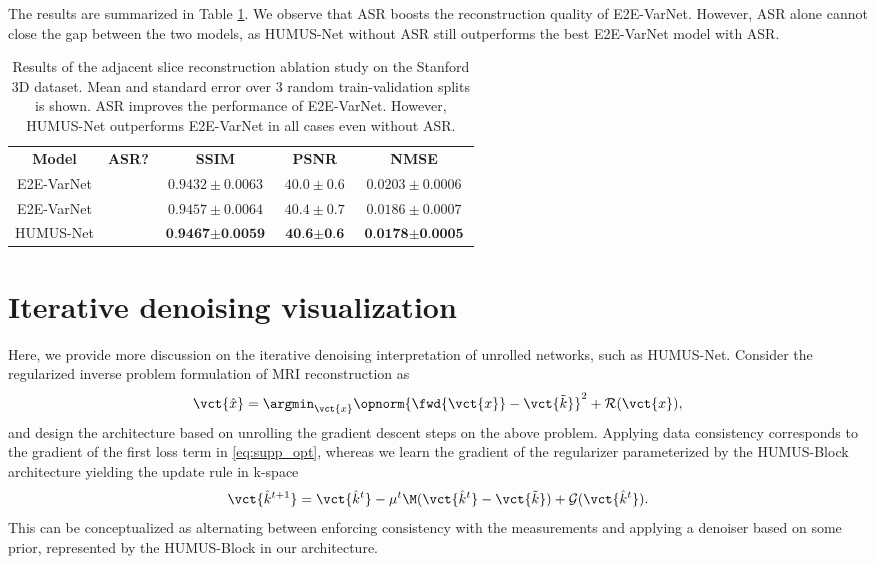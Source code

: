 The results are summarized in Table \ref{tab:apx_abl_asr}. We observe that ASR boosts the reconstruction quality of E2E-VarNet. However, ASR alone cannot close the gap between the two models, as HUMUS-Net without ASR still outperforms the best E2E-VarNet model with ASR.

\begin{table}
\centering
\begin{tabular}{ |c|c|c|c|c|  }
	\hline
	\textbf{Model} & \textbf{ASR?}	& \textbf{SSIM}&\textbf{PSNR} & \textbf{NMSE} \\
	\hhline{|=|=|=|=|=|}
	E2E-VarNet & \xmark & $0.9432 \pm 0.0063$&$40.0 \pm 0.6$&$0.0203 \pm 0.0006$\\
	E2E-VarNet & \checkmark & $0.9457 \pm 0.0064$&$40.4 \pm 0.7$& $0.0186 \pm 0.0007$\\
	HUMUS-Net & \xmark & $\textbf{0.9467} \pm \textbf{0.0059}$ &$\textbf{40.6} \pm \textbf{0.6}$&$\textbf{0.0178}\pm \textbf{0.0005}$\\
	\hline
\end{tabular}
\caption{Results of the adjacent slice reconstruction ablation study on the Stanford 3D dataset. Mean and standard error over $3$ random train-validation splits is shown. ASR improves the performance of E2E-VarNet. However, HUMUS-Net outperforms E2E-VarNet in all cases even without ASR.  \label{tab:apx_abl_asr}}	
\end{table}

\section{Iterative denoising visualization \label{sec:apx_iter}}
	Here, we provide more discussion on the iterative denoising interpretation of unrolled networks, such as HUMUS-Net. Consider the regularized inverse problem formulation of MRI reconstruction as 
	\begin{equation}
		\label{eq:supp_opt}
		\vct{\hat{x}} 
		= \argmin_{\vct{x}} \opnorm{  \fwd{\vct{x}} - \vct{\tilde{k}} }^2 + \mathcal{R}(\vct{x}),
	\end{equation}
  and design the architecture based on unrolling the gradient descent steps on the above problem. Applying data consistency corresponds to the gradient of the first loss term in \eqref{eq:supp_opt},
whereas we learn the gradient of the regularizer parameterized by the HUMUS-Block architecture yielding the update rule in k-space
  \begin{equation*}
	\vct{   \hat{   k}^{t+1}    } =\vct{   \hat{   k}^{t}    }   - \mu^t \M( \vct{   \hat{   k}^{t}    } -  \vct{\tilde{k}}) + \mathcal{G}(\vct{   \hat{   k}^{t}    } ).
\end{equation*} 
This can be conceptualized as alternating between enforcing consistency with the measurements and applying a denoiser based on some prior, represented by the HUMUS-Block in our architecture.
	
